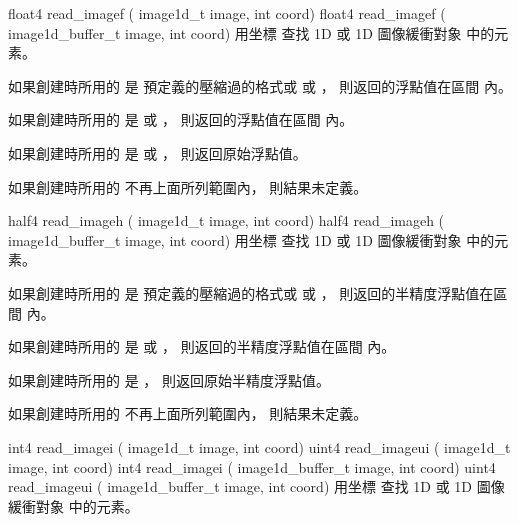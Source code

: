 float4 read_imagef (
	image1d_t image,
	int coord)
float4 read_imagef (
	image1d_buffer_t image,
	int coord)
\stopbuffer
{}
用坐標  查找 1D 或 1D 圖像緩衝對象  中的元素。

如果創建時所用的  是
預定義的壓縮過的格式或  或 ，
則返回的浮點值在區間 \math{[0.0 \cdots 1.0]} 內。

如果創建時所用的  是
  或 ，
則返回的浮點值在區間 \math{[-1.0 \cdots 1.0]} 內。

如果創建時所用的  是
  或 ，
則返回原始浮點值。

如果創建時所用的  不再上面所列範圍內，
則結果未定義。
\stopbuffer

half4 read_imageh (
	image1d_t image,
	int coord)
half4 read_imageh (
	image1d_buffer_t image,
	int coord)
\stopbuffer
{}
用坐標  查找 1D 或 1D 圖像緩衝對象  中的元素。

如果創建時所用的  是
預定義的壓縮過的格式或  或 ，
則返回的半精度浮點值在區間 \math{[0.0 \cdots 1.0]} 內。

如果創建時所用的  是
  或 ，
則返回的半精度浮點值在區間 \math{[-1.0 \cdots 1.0]} 內。

如果創建時所用的  是 ，
則返回原始半精度浮點值。

如果創建時所用的  不再上面所列範圍內，
則結果未定義。
\stopbuffer

int4 read_imagei (
	image1d_t image,
	int coord)
uint4 read_imageui (
	image1d_t image,
	int coord)
int4 read_imagei (
	image1d_buffer_t image,
	int coord)
uint4 read_imageui (
	image1d_buffer_t image,
	int coord)
\stopbuffer
{}
用坐標  查找 1D 或 1D 圖像緩衝對象  中的元素。

